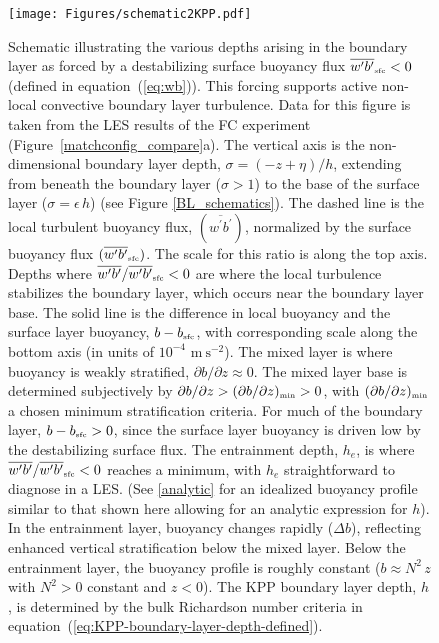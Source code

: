 \documentclass[preprint,12pt,authoryear]{agujournal}
\begin{document}
\begin{figure}[thbp]
\centering\texttt{[image: Figures/schematic2KPP.pdf]}
\caption{Schematic illustrating the various depths arising in the boundary layer as forced by a destabilizing surface buoyancy flux $\overline{w^\prime b^\prime}_{\mbox{\tiny sfc}} < 0$ (defined in equation~(\ref{eq:wb})). This forcing supports active non-local convective boundary layer turbulence. Data for this figure is taken from the LES results of the FC experiment (Figure~\ref{matchconfig_compare}a). The vertical axis is the non-dimensional boundary layer depth, $\sigma = (-z+\eta)/h$, extending from beneath the boundary layer ($\sigma > 1$) to the base of the surface layer ($\sigma = \epsilon \, h$) (see Figure \ref{BL_schematics}). The dashed line is the local turbulent buoyancy flux, $(\overline{w^\prime b^\prime})$,  normalized by the surface buoyancy flux $(\overline{w^\prime b^\prime}_{\mbox{\tiny sfc}})$. The scale for this ratio is along the top axis. Depths where $\overline{w^\prime b^\prime}/\overline{w^\prime b^\prime}_{\mbox{\tiny sfc}} < 0$ are where the local turbulence stabilizes the boundary layer, which occurs near the boundary layer base. The solid line is the difference in local buoyancy and  the surface layer buoyancy, $b - b_{\mbox{\tiny sfc}}$, with corresponding scale along the bottom axis (in units of $10^{-4}$ $\mbox{m}~\mbox{s}^{-2}$). The mixed layer is  where buoyancy is weakly stratified,  
$\partial b/\partial z \approx 0$. The mixed layer base is determined subjectively by $\partial b/\partial z > (\partial b/\partial z)_{\mbox{\tiny min}}> 0$, with $(\partial b/\partial z)_{\mbox{\tiny min}}$ a chosen minimum stratification criteria. For much of the boundary layer, $b - b_{\mbox{\tiny sfc}} > 0$, since the surface layer buoyancy is driven low by the destabilizing surface flux. The entrainment depth, $h_e$, is where $\overline{w^\prime b^\prime}/\overline{w^\prime b^\prime}_{\mbox{\tiny sfc}} < 0$ reaches a minimum, with $h_e$ straightforward to diagnose in a LES. (See \ref{analytic} for an idealized buoyancy profile similar to that shown here allowing for an analytic expression for $h$). In the entrainment layer, buoyancy changes rapidly ($\Delta b$), reflecting enhanced vertical stratification below the mixed layer.   Below the entrainment layer, the buoyancy profile is roughly constant ($b \approx N^2 \, z$ with $N^{2} > 0$ constant and $z<0$). The KPP boundary layer depth, $h$, is determined by the bulk Richardson number criteria in equation~(\ref{eq:KPP-boundary-layer-depth-defined}).}
\label{Vt_schematics}
\end{figure}
\end{document}
